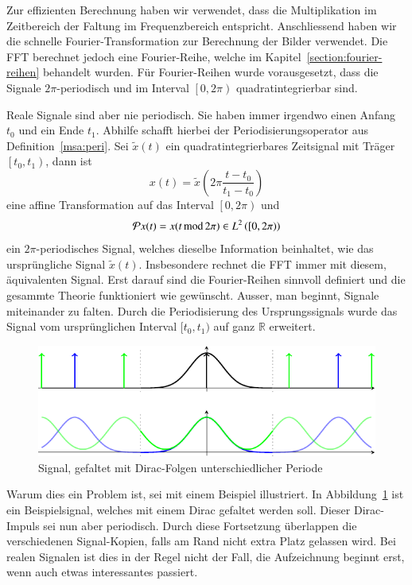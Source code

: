 
Zur effizienten Berechnung haben wir verwendet, dass die Multiplikation im Zeitbereich der Faltung im Frequenzbereich entspricht.
Anschliessend haben wir die schnelle Fourier-Transformation zur Berechnung der Bilder verwendet.
Die FFT berechnet jedoch eine Fourier-Reihe, welche im Kapitel~\ref{section:fourier-reihen} behandelt wurden.
Für Fourier-Reihen wurde vorausgesetzt, dass die Signale $2\pi$-periodisch und im Interval $\left[0, 2\pi\right)$ quadratintegrierbar sind.

Reale Signale sind aber nie periodisch.
Sie haben immer irgendwo einen Anfang $t_0$ und ein Ende $t_1$.
Abhilfe schafft hierbei der Periodisierungsoperator aus Definition~\ref{msa:peri}.
Sei $\tilde{x}(t)$ ein quadratintegrierbares Zeitsignal mit Träger $\left[t_0, t_1\right)$, dann ist
\[
	x(t) = \tilde{x}\left(2\pi\frac{t-t_0}{t_1-t_0}\right)
\]
eine affine Transformation auf das Interval $\left[0, 2\pi \right)$ und
\[
	\Peri x(t) = x( t \,\text{mod}\, 2\pi) \in L^2\left(\left[0, 2\pi \right)\right)
\]
ein $2\pi$-periodisches Signal, welches dieselbe Information beinhaltet, wie das ursprüngliche Signal $\tilde{x}(t)$.
Insbesondere rechnet die FFT immer mit diesem, äquivalenten Signal.
Erst darauf sind die Fourier-Reihen sinnvoll definiert und die gesammte Theorie funktioniert wie gewünscht.
Ausser, man beginnt, Signale miteinander zu falten.
Durch die Periodisierung des Ursprungssignals wurde das Signal vom ursprünglichen Interval $[t_0, t_1)$ auf ganz $\mathbb{R}$ erweitert.

\begin{figure}
	\centering
	\includegraphics{papers/complex/images/cyclic_conv.pdf}
	\caption{Signal, gefaltet mit Dirac-Folgen unterschiedlicher Periode}
	\label{complex:cyclic-conv}
\end{figure}

Warum dies ein Problem ist, sei mit einem Beispiel illustriert.
In Abbildung~\ref{complex:cyclic-conv} ist ein Beispielsignal, welches mit einem Dirac gefaltet werden soll.
Dieser Dirac-Impuls sei nun aber periodisch.
Durch diese Fortsetzung überlappen die verschiedenen Signal-Kopien, falls am Rand nicht extra Platz gelassen wird.
Bei realen Signalen ist dies in der Regel nicht der Fall, die Aufzeichnung beginnt erst, wenn auch etwas interessantes passiert.

